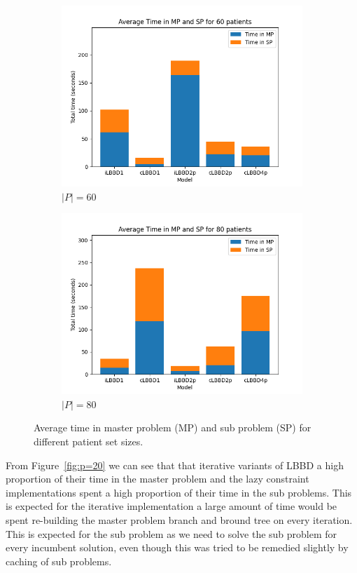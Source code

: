 \begin{figure}
\begin{subfigure}[b]{0.42\textwidth}
        \includegraphics[width=\textwidth]{plots/(60_timeinMPSP).png}
        \caption{$|P|=60$}\label{fig:p=60}
    \end{subfigure}
    \hfill
    \begin{subfigure}[b]{0.42\textwidth}
        \centering
        \includegraphics[width=\textwidth]{plots/(80_timeinMPSP).png}
        \caption{$|P|=80$}\label{fig:p=80}
    \end{subfigure}
    \caption{Average time in master problem (MP) and sub problem (SP) for different patient set sizes.}\label{fig:MPSPtime}
\end{figure}

From Figure~\ref{fig:p=20} we can see that that iterative variants of LBBD a high proportion of their time in the master problem and the lazy constraint implementations spent a high proportion of their time in the sub problems. This is expected for the iterative implementation a large amount of time would be spent re-building the master problem branch and bround tree on every iteration. This is expected for the sub problem as we need to solve the sub problem for every incumbent solution, even though this was tried to be remedied slightly by caching of sub problems.  